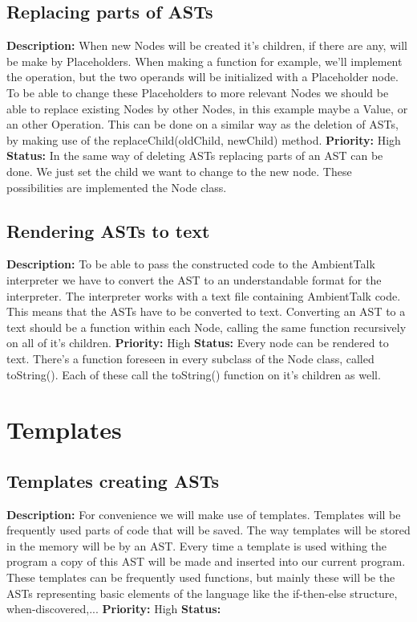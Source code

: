 \documentclass[a4paper,12pt]{report}
\begin{document}
\subsection{Replacing parts of ASTs}
\textbf{Description: }When new Nodes will be created it's children, if there are any, will be make by Placeholders. When making a function for example, we'll implement the operation,
but the two operands will be initialized with a Placeholder node. To be able to change these Placeholders to more relevant Nodes we should be able to 
replace existing Nodes by other Nodes, in this example maybe a Value, or an other Operation. This can be done on a similar way as the deletion of ASTs, by making use of the replaceChild(oldChild, newChild) method.\newline
\textbf{Priority:} High \newline
\textbf{Status: } In the same way of deleting ASTs replacing parts of an AST can be done. We just set the child we want to change to the 
new node. These possibilities are implemented the Node class.\newline
\subsection{Rendering ASTs to text}
\textbf{Description: } To be able to pass the constructed code to the AmbientTalk interpreter we have to convert the AST to an understandable format for the interpreter. The 
interpreter works with a text file containing AmbientTalk code. This means that the ASTs have to be converted to text. Converting an
AST to a text should be a function within each Node, calling the same function recursively on all of it's children.\newline
\textbf{Priority:} High \newline
\textbf{Status: } Every node can be rendered to text. There's a function foreseen in every subclass of the Node class, called toString(). 
Each of these call the toString() function on it's children as well.\newline
\section{Templates} 
\subsection{Templates creating ASTs}
\textbf{Description: } For convenience we will make use of templates. Templates will be frequently used parts of code that will be saved. The way templates will be stored in the 
memory will be by an AST. Every time a template is used withing the program a copy of this AST will be made and inserted into our current program.
These templates can be frequently used functions, but mainly these will be the ASTs representing basic elements of the language like the if-then-else structure, when-discovered,...\newline
\textbf{Priority:} High \newline
\textbf{Status: } \newline
\end{document}
